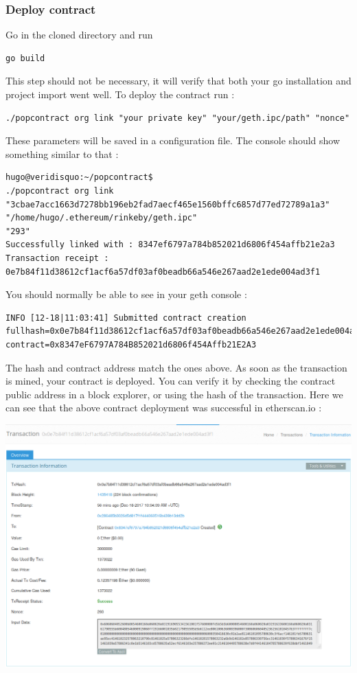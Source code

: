 \documentclass[11pt, a4paper, twoside, openright]{book} %
\begin{document}
\subsubsection*{Deploy contract}
Go in the cloned directory and run
\begin{verbatim}
go build
\end{verbatim}
This step should not be necessary, it will verify that both your go installation and project import went well.
To deploy the contract run :
\begin{verbatim}
./popcontract org link "your private key" "your/geth.ipc/path" "nonce"
\end{verbatim}
These parameters will be saved in a configuration file.
The console should show something similar to that :
\begin{verbatim}
hugo@veridisquo:~/popcontract$
./popcontract org link
"3cbae7acc1663d7278bb196eb2fad7aecf465e1560bffc6857d77ed72789a1a3"
"/home/hugo/.ethereum/rinkeby/geth.ipc"
"293"
Successfully linked with : 8347ef6797a784b852021d6806f454affb21e2a3
Transaction receipt :
0e7b84f11d38612cf1acf6a57df03af0beadb66a546e267aad2e1ede004ad3f1
\end{verbatim}
\begin{center}
\end{center}
You should normally be able to see in your geth console :
\begin{verbatim}
INFO [12-18|11:03:41] Submitted contract creation
fullhash=0x0e7b84f11d38612cf1acf6a57df03af0beadb66a546e267aad2e1ede004ad3f1
contract=0x8347eF6797A784B852021d6806f454Affb21E2A3
\end{verbatim}
The hash and contract address match the ones above.
As soon as the transaction is mined, your contract is deployed. You can verify it by checking the contract public address in a block explorer, or using the hash of the transaction. Here we can see that the above contract deployment was successful in etherscan.io :
\begin{center}
 \includegraphics[scale=0.38]{blockexplorer.jpg}
\end{center}
\end{document}
